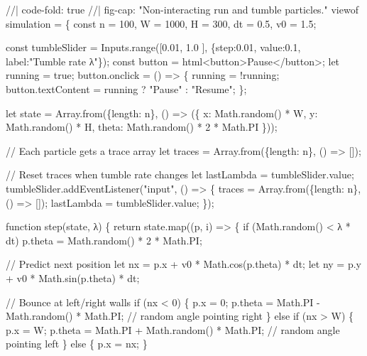 \documentclass[
  letterpaper,
  enabledeprecatedfontcommands]{report}
\newenvironment{Shaded}{\begin{snugshade}}{\end{snugshade}}
\newcommand{\NormalTok}[1]{\textcolor[rgb]{0.00,0.23,0.31}{#1}}
\begin{document}
\begin{Shaded}
\begin{Highlighting}[]
\NormalTok{//| code{-}fold: true}
\NormalTok{//| fig{-}cap: "Non{-}interacting run and tumble particles."}
\NormalTok{viewof simulation = \{}
\NormalTok{    const n = 100, W = 1000, H = 300, dt = 0.5, v0 = 1.5;}

\NormalTok{    const tumbleSlider = Inputs.range([0.01, 1.0}
\NormalTok{    ], \{step:0.01, value:0.1, label:"Tumble rate λ"\});}
\NormalTok{    const button = html\textasciigrave{}\textless{}button\textgreater{}Pause\textless{}/button\textgreater{}\textasciigrave{};}
\NormalTok{    let running = true;}
\NormalTok{    button.onclick = () =\textgreater{} \{}
\NormalTok{        running = !running;}
\NormalTok{        button.textContent = running ? "Pause" : "Resume";}
\NormalTok{    \};}

\NormalTok{    let state = Array.from(\{length: n\}, () =\textgreater{} (\{}
\NormalTok{        x: Math.random() * W,}
\NormalTok{        y: Math.random() * H,}
\NormalTok{        theta: Math.random() * 2 * Math.PI}
\NormalTok{    \}));}

\NormalTok{    // Each particle gets a trace array}
\NormalTok{    let traces = Array.from(\{length: n\}, () =\textgreater{} []);}

\NormalTok{    // Reset traces when tumble rate changes}
\NormalTok{    let lastLambda = tumbleSlider.value;}
\NormalTok{    tumbleSlider.addEventListener("input", () =\textgreater{} \{}
\NormalTok{        traces = Array.from(\{length: n\}, () =\textgreater{} []);}
\NormalTok{        lastLambda = tumbleSlider.value;}
\NormalTok{    \});}

\NormalTok{    function step(state, λ) \{}
\NormalTok{        return state.map((p, i) =\textgreater{} \{}
\NormalTok{            if (Math.random() \textless{} λ * dt) p.theta = Math.random() * 2 * Math.PI;}

\NormalTok{            // Predict next position}
\NormalTok{            let nx = p.x + v0 * Math.cos(p.theta) * dt;}
\NormalTok{            let ny = p.y + v0 * Math.sin(p.theta) * dt;}

\NormalTok{            // Bounce at left/right walls}
\NormalTok{            if (nx \textless{} 0) \{}
\NormalTok{                p.x = 0;}
\NormalTok{                p.theta = Math.PI {-} Math.random() * Math.PI; // random angle pointing right}
\NormalTok{            \} else if (nx \textgreater{} W) \{}
\NormalTok{                p.x = W;}
\NormalTok{                p.theta = Math.PI + Math.random() * Math.PI; // random angle pointing left}
\NormalTok{            \} else \{}
\NormalTok{                p.x = nx;}
\NormalTok{            \}}


\end{Highlighting}
\end{Shaded}
\end{document}
